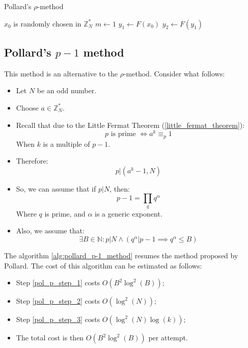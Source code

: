 \begin{algorithm}
\caption{Pollard's $\rho$-method}\label{alg:pollard_rho_method}

$x_{0}$ is randomly chosen in $\mathbb{Z}_{N}^{*}$\;
$m \gets 1$\;
$y_{1} \gets F(x_{0})$\;
$y_{2} \gets F(y_{1})$\;
\end{algorithm}

\subsection{Pollard's $p - 1$ method}
This method is an alternative to the $\rho$-method. Consider what follows:
\begin{itemize}
    \item Let $N$ be an odd number.
    \item Choose $a \in \mathbb{Z}_{N}^{*}$.
    \item Recall that due to the Little Fermat Theorem (\ref{little_fermat_theorem}):
    \[
    p \text{ is prime } \iff a^{k} \equiv_{p} 1
    \]
    When $k$ is a multiple of $p-1$.
    \item Therefore:
    \[p | (a^{k} - 1, N)\]
    \item So, we can assume that if $p | N$, then:
    \[
    p - 1 = \prod_{q} q^{\alpha}
    \]
    Where $q$ is prime, and $\alpha$ is a generic exponent.
    \item Also, we assume that:
    \[\exists B \in \mathbb{N}: p | N \land (q^{\alpha}| p - 1 \implies q^{\alpha} \leq B)\]
\end{itemize}
 The algorithm \ref{alg:pollard_p-1_method} resumes the method proposed by Pollard. \newline
 The cost of this algorithm can be estimated as follows:
 \begin{itemize}
     \item Step \ref{pol_p_step_1} costs $O(B^{2} \operatorname{log}^{2}(B))$;
     \item Step \ref{pol_p_step_2} costs $O(\operatorname{log}^{2}(N))$;
     \item Step \ref{pol_p_step_3} costs $O(\operatorname{log}^{2}(N)\operatorname{log}(k))$;
     \item The total cost is then $O(B^{2} \operatorname{log}^{2}(B))$ per attempt.
 \end{itemize}


